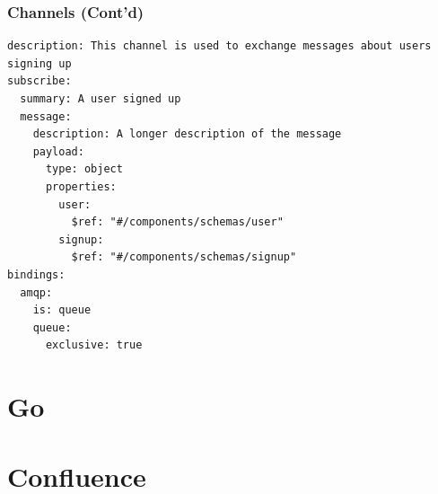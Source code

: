\documentclass{efd-lecture}
\begin{document}
\begin{frame}[fragile]
  \frametitle{Channels (Cont'd)}
  \begin{verbatim}
description: This channel is used to exchange messages about users signing up
subscribe:
  summary: A user signed up
  message:
    description: A longer description of the message
    payload:
      type: object
      properties:
        user:
          $ref: "#/components/schemas/user"
        signup:
          $ref: "#/components/schemas/signup"
bindings:
  amqp:
    is: queue
    queue:
      exclusive: true
  \end{verbatim}
\end{frame}

\section{Go}

\section{Confluence}
\end{document}
